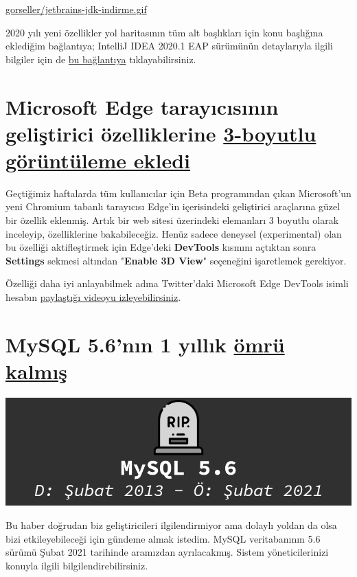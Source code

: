 \documentclass[11pt]{article}
\begin{document}
\url{gorseller/jetbrains-jdk-indirme.gif}


2020 yılı yeni özellikler yol haritasının tüm alt başlıkları için konu
başlığına eklediğim bağlantıya; IntelliJ IDEA 2020.1 EAP sürümünün
detaylarıyla ilgili bilgiler için de \href{https://blog.jetbrains.com/idea/2020/01/intellij-idea-2020-1-eap/}{bu bağlantıya} tıklayabilirsiniz.
\section{Microsoft Edge tarayıcısının geliştirici özelliklerine \href{https://blogs.windows.com/msedgedev/2020/01/23/debug-z-index-3d-view-edge-devtools/}{3-boyutlu görüntüleme ekledi}}
\label{sec:org3fed82f}
Geçtiğimiz haftalarda tüm kullanıcılar için Beta programından çıkan
Microsoft'un yeni Chromium tabanlı tarayıcısı Edge'in içerisindeki geliştirici
araçlarına güzel bir özellik eklenmiş. Artık bir web sitesi üzerindeki
elemanları 3 boyutlu olarak inceleyip, özelliklerine bakabileceğiz. Henüz
sadece deneysel (experimental) olan bu özelliği aktifleştirmek için Edge'deki
\textbf{DevTools} kısmını açtıktan sonra \textbf{Settings} sekmesi altından "\textbf{Enable 3D
View}" seçeneğini işaretlemek gerekiyor.

Özelliği daha iyi anlayabilmek adına Twitter'daki Microsoft Edge DevTools
isimli hesabın \href{https://twitter.com/EdgeDevTools/status/1220399837956333569}{paylaştığı videoyu izleyebilirsiniz}.
\section{MySQL 5.6'nın 1 yıllık \href{https://lefred.be/content/mysql-5-6-eol-is-february-2021/}{ömrü kalmış}}
\label{sec:org0c5779d}
\begin{center}
\includegraphics[width=.9\linewidth]{gorseller/mysql56-olum.png}
\end{center}

Bu haber doğrudan biz geliştiricileri ilgilendirmiyor ama dolaylı yoldan da
olsa bizi etkileyebileceği için gündeme almak istedim. MySQL veritabanının 5.6
sürümü Şubat 2021 tarihinde aramızdan ayrılacakmış. Sistem yöneticilerinizi
konuyla ilgili bilgilendirebilirsiniz.
\end{document}
